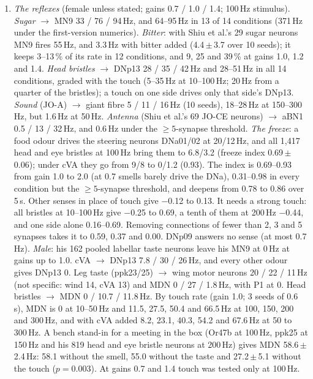 \documentclass[11pt,a4paper]{article}
\begin{document}
\begin{enumerate}[leftmargin=*, label=\arabic*., itemsep=4pt]
\item \emph{The reflexes} (female unless stated; gains 0.7 / 1.0 / 1.4; 100\,Hz stimulus). \emph{Sugar} $\rightarrow$ MN9 33 / 76 / 94\,Hz, and 64--95\,Hz in 13 of 14 conditions (371\,Hz under the first-version numerics). \emph{Bitter}: with Shiu et al.'s 29 sugar neurons MN9 fires 55\,Hz, and 3.3\,Hz with bitter added (4.4\,$\pm$\,3.7 over 10 seeds); it keeps 3--13\,\% of its rate in 12 conditions, and 9, 25 and 39\,\% at gains 1.0, 1.2 and 1.4. \emph{Head bristles} $\rightarrow$ DNp13 28 / 35 / 42\,Hz and 28--51\,Hz in all 14 conditions, graded with the touch (5--35\,Hz at 10--100\,Hz; 20\,Hz from a quarter of the bristles); a touch on one side drives only that side's DNp13. \emph{Sound} (JO-A) $\rightarrow$ giant fibre 5 / 11 / 16\,Hz (10 seeds), 18--28\,Hz at 150--300\,Hz, but 1.6\,Hz at 50\,Hz. \emph{Antenna} (Shiu et al.'s 69 JO-CE neurons) $\rightarrow$ aBN1 0.5 / 13 / 32\,Hz, and 0.6\,Hz under the $\geq5$-synapse threshold. \emph{The freeze}: a food odour drives the steering neurons DNa01/02 at 20/12\,Hz, and all 1{,}417 head and eye bristles at 100\,Hz bring them to 6.8/3.2 (freeze index 0.69\,$\pm$\,0.06); under cVA they go from 9/8 to 0/1.2 (0.93). The index is 0.69--0.93 from gain 1.0 to 2.0 (at 0.7 smells barely drive the DNa), 0.31--0.98 in every condition but the $\geq5$-synapse threshold, and deepens from 0.78 to 0.86 over 5\,s. Other senses in place of touch give $-$0.12 to 0.13. It needs a strong touch: all bristles at 10--100\,Hz give $-$0.25 to 0.69, a tenth of them at 200\,Hz $-$0.44, and one side alone 0.16--0.69. Removing connections of fewer than 2, 3 and 5 synapses takes it to 0.59, 0.37 and 0.00. DNp09 answers no sense (at most 0.7\,Hz). \emph{Male}: his 162 pooled labellar taste neurons leave his MN9 at 0\,Hz at gains up to 1.0. cVA $\rightarrow$ DNp13 7.8 / 30 / 26\,Hz, and every other odour gives DNp13 0. Leg taste (ppk23/25) $\rightarrow$ wing motor neurons 20 / 22 / 11\,Hz (not specific: wind 14, cVA 13) and MDN 0 / 27 / 1.8\,Hz, with P1 at 0. Head bristles $\rightarrow$ MDN 0 / 10.7 / 11.8\,Hz. By touch rate (gain 1.0; 3 seeds of 0.6\,s), MDN is 0 at 10--50\,Hz and 11.5, 27.5, 50.4 and 66.5\,Hz at 100, 150, 200 and 300\,Hz, and with cVA added 8.2, 23.1, 40.3, 54.2 and 67.6\,Hz at 50 to 300\,Hz. A bench stand-in for a meeting in the box (Or47b at 100\,Hz, ppk25 at 150\,Hz and his 819 head and eye bristle neurons at 200\,Hz) gives MDN 58.6\,$\pm$\,2.4\,Hz: 58.1 without the smell, 55.0 without the taste and 27.2\,$\pm$\,5.1 without the touch ($p=0.003$). At gains 0.7 and 1.4 touch was tested only at 100\,Hz.


\end{enumerate}
\end{document}

